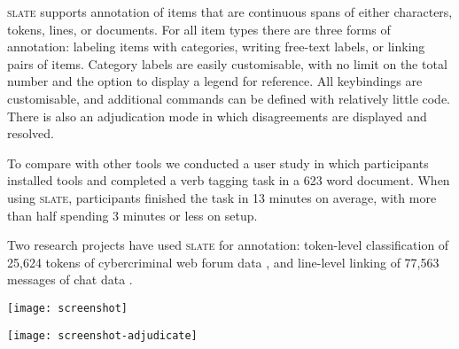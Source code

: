 \documentclass[11pt,a4paper]{article}
\newcommand\Slate{\textsc{slate}\xspace}
\newcommand\slate{\textsc{slate}\xspace}
\begin{document}
\Slate supports annotation of items that are continuous spans of either characters, tokens, lines, or documents.
For all item types there are three forms of annotation: labeling items with categories, writing free-text labels, or linking pairs of items.
Category labels are easily customisable, with no limit on the total number and the option to display a legend for reference.
All keybindings are customisable, and additional commands can be defined with relatively little code.
There is also an adjudication mode in which disagreements are displayed and resolved.

To compare with other tools we conducted a user study in which participants installed tools and completed a verb tagging task in a 623 word document.
When using \slate, participants finished the task in 13 minutes on average, with more than half spending 3 minutes or less on setup.

Two research projects have used \slate for annotation:
token-level classification of 25,624 tokens of cybercriminal web forum data \citep{www17forums},
and line-level linking of 77,563 messages of chat data \citep{acl19disentangle}.

\begin{figure*}
  \begin{minipage}[b]{.48\linewidth}
  \centering
    \texttt{[image: screenshot]}
  \label{fig:classify}
  \end{minipage}\hfill%
  \begin{minipage}[b]{.48\linewidth}
  \centering
    \texttt{[image: screenshot-adjudicate]}
  \label{fig:adjudicate}
  \end{minipage}
  \caption{
  Screenshots of terminal windows with \slate running.
  We have intentionally used two different font sizes to show how the user interface can scale, which is helpful for visually impaired users.
  }\label{fig:screenshot}
\end{figure*}
\end{document}
